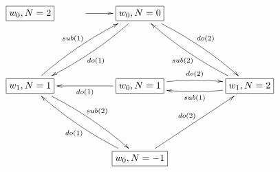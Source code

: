 $\xymatrix{
\fbox{$\location_0, N=2$} & \ar[r] & \fbox{$\location_0, N=0$} \ar@/^/[ddll]^{do(1)} \ar@/^/[ddrr]^{do(2)} && \\ \\
 \fbox{$\location_1, N=1$} \ar@/^/[uurr]^{sub(1)} \ar@/^/[ddrr]^{sub(2)} && \fbox{$\location_0, N=1$} \ar[ll]^{do(1)} \ar@/^/[rr]^{do(2)} && \fbox{$\location_1, N=2$} \ar@/^/[ll]^{sub(1)} \ar@/^/[uull]^{sub(2)} \\\\
 && \fbox{$\location_0, N=-1$} \ar@/^/[uull]^{do(1)} \ar[uurr]^{do(2)}}$

